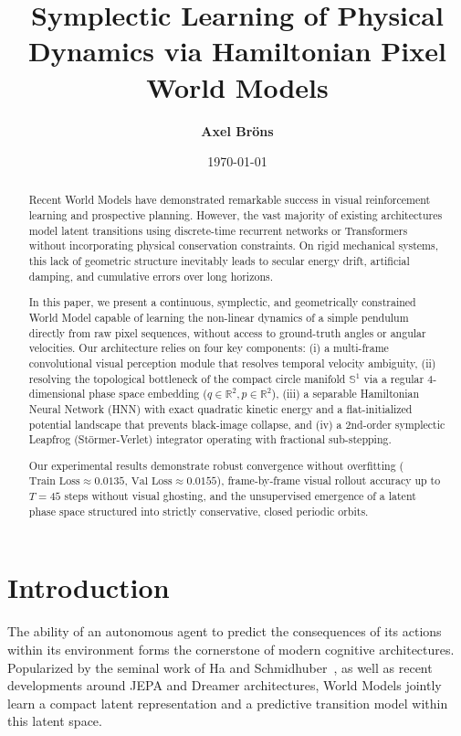 \documentclass[11pt]{article}
\title{\textbf{Symplectic Learning of Physical Dynamics via Hamiltonian Pixel World Models}}
\author{\textbf{Axel Bröns}}
\date{\today}
\begin{document}
\maketitle

\begin{abstract}
Recent World Models have demonstrated remarkable success in visual reinforcement learning and prospective planning. However, the vast majority of existing architectures model latent transitions using discrete-time recurrent networks or Transformers without incorporating physical conservation constraints. On rigid mechanical systems, this lack of geometric structure inevitably leads to secular energy drift, artificial damping, and cumulative errors over long horizons.

In this paper, we present a continuous, symplectic, and geometrically constrained World Model capable of learning the non-linear dynamics of a simple pendulum directly from raw pixel sequences, without access to ground-truth angles or angular velocities. Our architecture relies on four key components: (i) a multi-frame convolutional visual perception module that resolves temporal velocity ambiguity, (ii) resolving the topological bottleneck of the compact circle manifold $\mathbb{S}^1$ via a regular 4-dimensional phase space embedding ($q \in \mathbb{R}^2, p \in \mathbb{R}^2$), (iii) a separable Hamiltonian Neural Network (HNN) with exact quadratic kinetic energy and a flat-initialized potential landscape that prevents black-image collapse, and (iv) a 2nd-order symplectic Leapfrog (Störmer-Verlet) integrator operating with fractional sub-stepping.

Our experimental results demonstrate robust convergence without overfitting ($\text{Train Loss} \approx 0.0135$, $\text{Val Loss} \approx 0.0155$), frame-by-frame visual rollout accuracy up to $T=45$ steps without visual ghosting, and the unsupervised emergence of a latent phase space structured into strictly conservative, closed periodic orbits.
\end{abstract}

\section{Introduction}
\label{sec:intro}

The ability of an autonomous agent to predict the consequences of its actions within its environment forms the cornerstone of modern cognitive architectures. Popularized by the seminal work of Ha and Schmidhuber~\cite{ha2018worldmodels}, as well as recent developments around JEPA and Dreamer architectures, World Models jointly learn a compact latent representation and a predictive transition model within this latent space.
\end{document}
